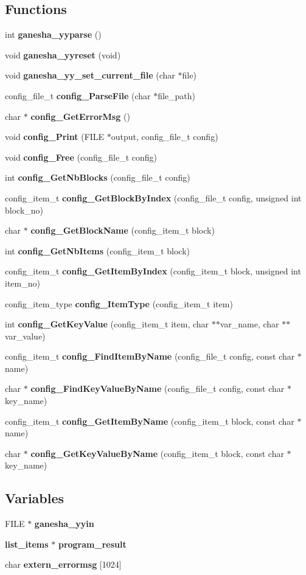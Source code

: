 \subsection*{Functions}
\begin{DoxyCompactItemize}
\item 
int {\bf ganesha\_\-yyparse} ()
\item 
void {\bf ganesha\_\-yyreset} (void)
\item 
void {\bf ganesha\_\-yy\_\-set\_\-current\_\-file} (char $\ast$file)
\item 
config\_\-file\_\-t {\bf config\_\-ParseFile} (char $\ast$file\_\-path)
\item 
char $\ast$ {\bf config\_\-GetErrorMsg} ()
\item 
void {\bf config\_\-Print} (FILE $\ast$output, config\_\-file\_\-t config)
\item 
void {\bf config\_\-Free} (config\_\-file\_\-t config)
\item 
int {\bf config\_\-GetNbBlocks} (config\_\-file\_\-t config)
\item 
config\_\-item\_\-t {\bf config\_\-GetBlockByIndex} (config\_\-file\_\-t config, unsigned int block\_\-no)
\item 
char $\ast$ {\bf config\_\-GetBlockName} (config\_\-item\_\-t block)
\item 
int {\bf config\_\-GetNbItems} (config\_\-item\_\-t block)
\item 
config\_\-item\_\-t {\bf config\_\-GetItemByIndex} (config\_\-item\_\-t block, unsigned int item\_\-no)
\item 
config\_\-item\_\-type {\bf config\_\-ItemType} (config\_\-item\_\-t item)
\item 
int {\bf config\_\-GetKeyValue} (config\_\-item\_\-t item, char $\ast$$\ast$var\_\-name, char $\ast$$\ast$var\_\-value)
\item 
config\_\-item\_\-t {\bf config\_\-FindItemByName} (config\_\-file\_\-t config, const char $\ast$name)
\item 
char $\ast$ {\bf config\_\-FindKeyValueByName} (config\_\-file\_\-t config, const char $\ast$key\_\-name)
\item 
config\_\-item\_\-t {\bf config\_\-GetItemByName} (config\_\-item\_\-t block, const char $\ast$name)
\item 
char $\ast$ {\bf config\_\-GetKeyValueByName} (config\_\-item\_\-t block, const char $\ast$key\_\-name)
\end{DoxyCompactItemize}
\subsection*{Variables}
\begin{DoxyCompactItemize}
\item 
FILE $\ast$ {\bf ganesha\_\-yyin}
\item 
{\bf list\_\-items} $\ast$ {\bf program\_\-result}
\item 
char {\bf extern\_\-errormsg} [1024]
\end{DoxyCompactItemize}


